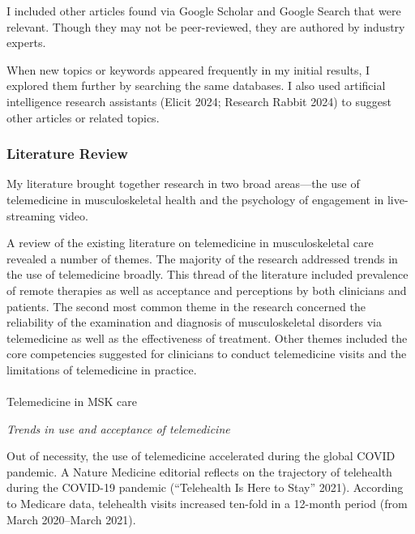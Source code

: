 \documentclass[
  letterpaper,
]{article}
\makeatletter
\let\oldparagraph\paragraph
\renewcommand{\paragraph}{
    \@ifstar
      \xxxParagraphStar
      \xxxParagraphNoStar
  }
\newcommand{\xxxParagraphStar}[1]{\oldparagraph*{#1}\mbox{}}
\newcommand{\xxxParagraphNoStar}[1]{\oldparagraph{#1}\mbox{}}
\makeatother
\begin{document}
I included other articles found via Google Scholar and Google Search
that were relevant. Though they may not be peer-reviewed, they are
authored by industry experts.

When new topics or keywords appeared frequently in my initial results, I
explored them further by searching the same databases. I also used
artificial intelligence research assistants (Elicit 2024; Research
Rabbit 2024) to suggest other articles or related topics.

\subsubsection{Literature Review}\label{literature-review}

My literature brought together research in two broad areas---the use of
telemedicine in musculoskeletal health and the psychology of engagement
in live-streaming video.

A review of the existing literature on telemedicine in musculoskeletal
care revealed a number of themes. The majority of the research addressed
trends in the use of telemedicine broadly. This thread of the literature
included prevalence of remote therapies as well as acceptance and
perceptions by both clinicians and patients. The second most common
theme in the research concerned the reliability of the examination and
diagnosis of musculoskeletal disorders via telemedicine as well as the
effectiveness of treatment. Other themes included the core competencies
suggested for clinicians to conduct telemedicine visits and the
limitations of telemedicine in practice.

\paragraph{Telemedicine in MSK care}\label{telemedicine-in-msk-care}

\emph{Trends in use and acceptance of telemedicine}

Out of necessity, the use of telemedicine accelerated during the global
COVID pandemic. A Nature Medicine editorial reflects on the trajectory
of telehealth during the COVID-19 pandemic ({``Telehealth Is Here to
Stay''} 2021). According to Medicare data, telehealth visits increased
ten-fold in a 12-month period (from March 2020--March 2021).
\end{document}
